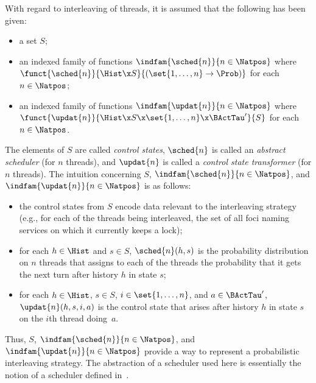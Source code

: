 \documentclass{llncs}
\begin{document}
With regard to interleaving of threads, it is assumed that the following 
has been given:
\begin{itemize}
\sloppy
\item
a set $S$; 
\item
an indexed family of functions $\indfam{\sched{n}}{n \in \Natpos}$
where 
$\funct{\sched{n}}{\Hist \x S}{(\set{1,\ldots,n} \to \Prob)}$
for each $n \in \Natpos$;
\item
an indexed family of functions $\indfam{\updat{n}}{n \in \Natpos}$
where 
$\funct{\updat{n}}{\Hist \x S \x \set{1,\ldots,n} \x \BActTau'}{S}$
for each $n \in \Natpos$.
\end{itemize}
The elements of $S$ are called \emph{control states}, $\sched{n}$ is 
called an \emph{abstract scheduler} (for $n$ threads), and $\updat{n}$ 
is called a \emph{control state transformer} (for $n$ threads).
The intuition concerning $S$, $\indfam{\sched{n}}{n \in \Natpos}$, and 
$\indfam{\updat{n}}{n \in \Natpos}$ is as follows:
\begin{itemize}
\item
the control states from $S$ encode data relevant to the interleaving 
strategy (e.g., for each of the threads being interleaved, the set of 
all foci naming services on which it currently keeps a lock);
\item
for each $h \in \Hist$ and $s \in S$, $\sched{n}(h,s)$ is the 
probability distribution on $n$ threads that assigns to each of the 
threads the probability that it gets the next turn after history $h$ in 
state $s$;
\item
for each $h \in \Hist$, $s \in S$, $i \in \set{1,\ldots,n}$, and 
$a \in \BActTau'$, $\updat{n}(h,s,i,a)$ is the control state that arises 
after history $h$ in state $s$ on the $i$th thread doing~$a$.
\end{itemize}
Thus, $S$, $\indfam{\sched{n}}{n \in \Natpos}$, and 
$\indfam{\updat{n}}{n \in \Natpos}$ provide a way to represent a 
probabilistic interleaving strategy.
The abstraction of a scheduler used here is essentially the notion of
a scheduler defined in~\cite{SS00a}.
\end{document}
